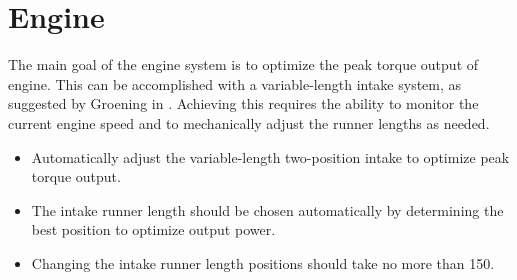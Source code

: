  \section{Engine}

The main goal of the engine system is to optimize the peak torque output of engine. This can be accomplished with a variable-length intake system, as suggested by Groening in \cite{LucasIntake}. Achieving this requires the ability to monitor the current engine speed and to mechanically adjust the runner lengths as needed.

\begin{itemize}
\item Automatically adjust the variable-length two-position intake to optimize peak torque output.
\item The intake runner length should be chosen automatically by determining the best position to optimize output power.
\item Changing the intake runner length positions should take no more than \unit{150}{\milli\second}.
\end{itemize}
